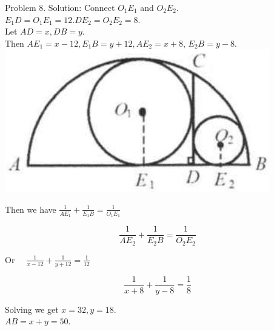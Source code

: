 \documentclass[10pt]{article}
\begin{document}
Problem 8. Solution:
Connect \(O_{1} E_{1}\) and \(O_{2} E_{2}\).\\
\(E_{1} D=O_{1} E_{1}=12 . D E_{2}=O_{2} E_{2}=8\).\\
Let \(A D=x, D B=y\).\\
Then \(A E_{1}=x-12, E_{1} B=y+12, A E_{2}=x+8\), \(E_{2} B=y-8\).\\
\includegraphics[max width=\textwidth, center]{2025_04_17_97bc1f7e44d93c271a88g-189(1)}

Then we have \(\frac{1}{A E_{1}}+\frac{1}{E_{1} B}=\frac{1}{O_{1} E_{1}}\)

\[
\frac{1}{A E_{2}}+\frac{1}{E_{2} B}=\frac{1}{O_{2} E_{2}}
\]

Or \(\quad \frac{1}{x-12}+\frac{1}{y+12}=\frac{1}{12}\)

\[
\frac{1}{x+8}+\frac{1}{y-8}=\frac{1}{8}
\]

Solving we get \(x=32, y=18\).\\
\(A B=x+y=50\).
\end{document}
